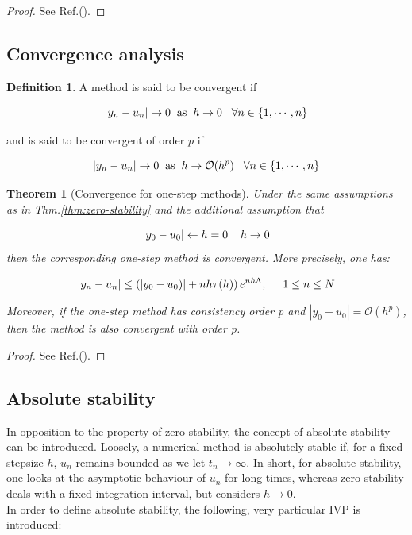 \documentclass[11pt]{article}
\theoremstyle{theorem}
\newtheorem{theorem}{Theorem}
\theoremstyle{definition}
\newtheorem{definition}{Definition}
\begin{document}
\begin{proof}
	See Ref.(\cite{lec-notes}).
\end{proof}


\subsection{Convergence analysis}
\begin{definition}
	\label{def:convergence}
	A method is said to be convergent if 
	
	$$|y_n-u_n|\rightarrow 0\hspace{2mm}\text{as}\hspace{2mm}h\rightarrow 0\hspace{3mm}\forall n\in\lbrace 1,\cdots, n\rbrace$$
	
	and is said to be convergent of order $p$ if 
	
	
	$$|y_n-u_n|\rightarrow 0\hspace{2mm}\text{as}\hspace{2mm}h\rightarrow \mathcal{O}(h^p)\hspace{3mm}\forall n\in\lbrace 1,\cdots, n\rbrace$$
\end{definition}

\begin{theorem}[Convergence for one-step methods]
	\label{thm:convergence-one-step}
	Under the same assumptions as in Thm.\ref{thm:zero-stability} and the additional assumption that 
	
	$$|y_0-u_0|\leftarrow h=0\hspace{4mm}h\rightarrow 0$$
    then the corresponding one-step method is convergent. More precisely, one has:
    
    \begin{align}
    	\label{eqn:convergence-one-step}
    	|y_n-u_n|\le\left(|y_0-u_0)|+nh\tau (h)\right)e^{nh\Lambda},\hspace{5mm}1\le n\le N
    \end{align}
    
    Moreover, if the one-step method has consistency order p and $|y_0-u_0|=\mathcal{O}(h^p)$, then the method is also convergent with order p.\\
\end{theorem}

\begin{proof}
	See Ref.(\cite{lec-notes}).
\end{proof}

\subsection{Absolute stability}
In opposition to the property of zero-stability, the concept of absolute stability can be introduced. Loosely, a numerical method is absolutely stable if, for a fixed stepsize
$h$, $u_n$ remains bounded as we let $t_n\rightarrow\infty$. In short, for absolute stability, one looks at the asymptotic behaviour of $u_n$ for long times, whereas zero-stability deals with a fixed integration interval, but considers $h\rightarrow 0$.\\
In order to define absolute stability, the following, very particular IVP is introduced: 
\end{document}
